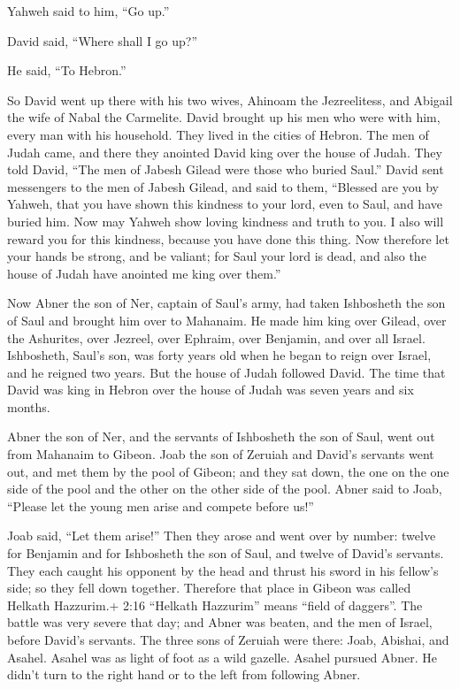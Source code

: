 Yahweh said to him, ``Go up.''

David said, ``Where shall I go up?''

He said, ``To Hebron.''

 So David went up there with his two wives, Ahinoam the
Jezreelitess, and Abigail the wife of Nabal the Carmelite. 
David brought up his men who were with him, every man with his
household. They lived in the cities of Hebron.  The men of
Judah came, and there they anointed David king over the house of Judah.
They told David, ``The men of Jabesh Gilead were those who buried
Saul.''  David sent messengers to the men of Jabesh Gilead,
and said to them, ``Blessed are you by Yahweh, that you have shown this
kindness to your lord, even to Saul, and have buried him. 
Now may Yahweh show loving kindness and truth to you. I also will reward
you for this kindness, because you have done this thing. 
Now therefore let your hands be strong, and be valiant; for Saul your
lord is dead, and also the house of Judah have anointed me king over
them.''

 Now Abner the son of Ner, captain of Saul's army, had taken
Ishbosheth the son of Saul and brought him over to Mahanaim.
 He made him king over Gilead, over the Ashurites, over
Jezreel, over Ephraim, over Benjamin, and over all Israel. 
Ishbosheth, Saul's son, was forty years old when he began to reign over
Israel, and he reigned two years. But the house of Judah followed David.
 The time that David was king in Hebron over the house of
Judah was seven years and six months.

 Abner the son of Ner, and the servants of Ishbosheth the
son of Saul, went out from Mahanaim to Gibeon.  Joab the
son of Zeruiah and David's servants went out, and met them by the pool
of Gibeon; and they sat down, the one on the one side of the pool and
the other on the other side of the pool.  Abner said to
Joab, ``Please let the young men arise and compete before us!''

Joab said, ``Let them arise!''  Then they arose and went
over by number: twelve for Benjamin and for Ishbosheth the son of Saul,
and twelve of David's servants.  They each caught his
opponent by the head and thrust his sword in his fellow's side; so they
fell down together. Therefore that place in Gibeon was called Helkath
Hazzurim.+ 2:16 ``Helkath Hazzurim'' means ``field of daggers''.
 The battle was very severe that day; and Abner was beaten,
and the men of Israel, before David's servants.  The three
sons of Zeruiah were there: Joab, Abishai, and Asahel. Asahel was as
light of foot as a wild gazelle.  Asahel pursued Abner. He
didn't turn to the right hand or to the left from following Abner.

